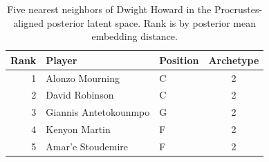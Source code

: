 \begin{table}[htbp]
  \centering\small
  \begin{tabular}{rllc}
    \toprule
    Rank & Player & Position & Archetype \\
    \midrule
    1 & Alonzo Mourning & C & 2 \\
    2 & David Robinson & C & 2 \\
    3 & Giannis Antetokounmpo & G & 2 \\
    4 & Kenyon Martin & F & 2 \\
    5 & Amar'e Stoudemire & F & 2 \\
    \bottomrule
  \end{tabular}
  \caption{Five nearest neighbors of Dwight Howard in the Procrustes-aligned posterior latent space. Rank is by posterior mean embedding distance.}
  \label{tab:Dwight_Howard_neighbors}
\end{table}

